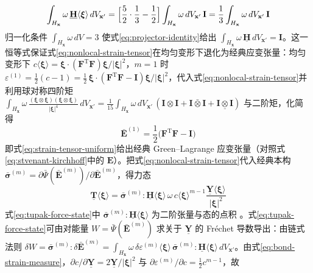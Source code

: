 \begin{equation}
  \int_{H_{\mathbf{x}}}\omega\,\underline{\mathbf{H}}\langle\boldsymbol{\xi}\rangle\,dV_{\mathbf{x}'}
  =\Bigl[\frac{5}{2}\cdot\frac{1}{3}-\frac{1}{2}\Bigr]\int_{H_{\mathbf{x}}}\omega\,dV_{\mathbf{x}'}\,\mathbf{I}
  =\frac{1}{3}\int_{H_{\mathbf{x}}}\omega\,dV_{\mathbf{x}'}\,\mathbf{I}
  \label{eq:projector-identity}
\end{equation}
归一化条件 $\int_{H_{\mathbf{x}}}\omega\,dV=3$ 使式\eqref{eq:projector-identity}给出 $\int_{H_{\mathbf{x}}}\omega\,\underline{\mathbf{H}}\,dV_{\mathbf{x}'}=\mathbf{I}$。这一恒等式保证式\eqref{eq:nonlocal-strain-tensor}在均匀变形下退化为经典应变张量：均匀变形下 $c\langle\boldsymbol{\xi}\rangle=\boldsymbol{\xi}\cdot(\mathbf{F}^{\mathrm{T}}\mathbf{F})\boldsymbol{\xi}/|\boldsymbol{\xi}|^{2}$，$m=1$ 时 $\varepsilon^{(1)}=\tfrac{1}{2}(c-1)=\tfrac{1}{2}\,\boldsymbol{\xi}\cdot(\mathbf{F}^{\mathrm{T}}\mathbf{F}-\mathbf{I})\boldsymbol{\xi}/|\boldsymbol{\xi}|^{2}$，代入式\eqref{eq:nonlocal-strain-tensor}并利用球对称四阶矩 $\int_{H_{\mathbf{x}}}\omega\,\tfrac{(\boldsymbol{\xi}\otimes\boldsymbol{\xi})(\boldsymbol{\xi}\otimes\boldsymbol{\xi})}{|\boldsymbol{\xi}|^{4}}\,dV_{\mathbf{x}'}=\tfrac{1}{15}\int_{H_{\mathbf{x}}}\omega\,dV_{\mathbf{x}'}\,(\mathbf{I}\otimes\mathbf{I}+\mathbf{I}\bar{\otimes}\mathbf{I}+\mathbf{I}\underline{\otimes}\mathbf{I})$ 与二阶矩，化简得
\begin{equation}
  \bar{\mathbf{E}}^{(1)}=\frac{1}{2}\bigl(\mathbf{F}^{\mathrm{T}}\mathbf{F}-\mathbf{I}\bigr)
  \label{eq:strain-tensor-uniform}
\end{equation}
即式\eqref{eq:strain-tensor-uniform}给出经典 Green–Lagrange 应变张量（对照式\eqref{eq:stvenant-kirchhoff}中的 $\mathbf{E}$）\cite{TupekRadovitzky2014}。把式\eqref{eq:nonlocal-strain-tensor}代入经典本构 $\bar{\boldsymbol{\sigma}}^{(m)}=\partial\bar{\Psi}(\bar{\mathbf{E}}^{(m)})/\partial\bar{\mathbf{E}}^{(m)}$，得力态
\begin{equation}
  \underline{\mathbf{T}}\langle\boldsymbol{\xi}\rangle
  =\bar{\boldsymbol{\sigma}}^{(m)}:\underline{\mathbf{H}}\langle\boldsymbol{\xi}\rangle\,\omega\,c\langle\boldsymbol{\xi}\rangle^{m-1}
  \frac{\underline{\mathbf{Y}}\langle\boldsymbol{\xi}\rangle}{|\boldsymbol{\xi}|^{2}}
  \label{eq:tupak-force-state}
\end{equation}
式\eqref{eq:tupak-force-state}中 $\bar{\boldsymbol{\sigma}}^{(m)}:\underline{\mathbf{H}}\langle\boldsymbol{\xi}\rangle$ 为二阶张量与态的点积 \cite{TupekRadovitzky2014}。式\eqref{eq:tupak-force-state}可由对能量 $W=\bar{\Psi}(\bar{\mathbf{E}}^{(m)})$ 求关于 $\underline{\mathbf{Y}}$ 的 Fréchet 导数导出：由链式法则 $\delta W=\bar{\boldsymbol{\sigma}}^{(m)}:\delta\bar{\mathbf{E}}^{(m)}=\int_{H_{\mathbf{x}}}\omega\,\delta\varepsilon^{(m)}\langle\boldsymbol{\xi}\rangle\,\bar{\boldsymbol{\sigma}}^{(m)}:\underline{\mathbf{H}}\langle\boldsymbol{\xi}\rangle\,dV_{\mathbf{x}'}$。由式\eqref{eq:bond-strain-measure}，$\partial c/\partial\underline{\mathbf{Y}}=2\underline{\mathbf{Y}}/|\boldsymbol{\xi}|^{2}$ 与 $\partial\varepsilon^{(m)}/\partial c=\tfrac{1}{2}c^{m-1}$，故
